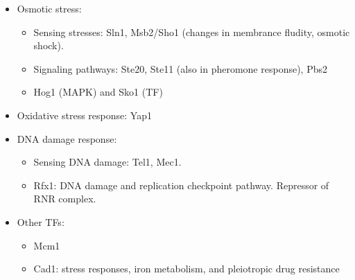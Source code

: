 \documentclass{report}
\begin{document}
\begin{itemize}
\item Osmotic stress: 
\begin{itemize}
	\item Sensing stresses: Sln1, Msb2/Sho1 (changes in membrance fludity, osmotic shock). 
	\item Signaling pathways: Ste20, Ste11 (also in pheromone response), Pbs2
	\item Hog1 (MAPK) and Sko1 (TF)
\end{itemize}

\item Oxidative stress response: Yap1

\item DNA damage response: 
\begin{itemize}
	\item Sensing DNA damage: Tel1, Mec1. 
	\item Rfx1: DNA damage and replication checkpoint pathway. Repressor of RNR complex. 
\end{itemize}

\item Other TFs: 
\begin{itemize}
	\item Mcm1
	\item Cad1: stress responses, iron metabolism, and pleiotropic drug resistance
\end{itemize}
\end{itemize}
\end{document}
